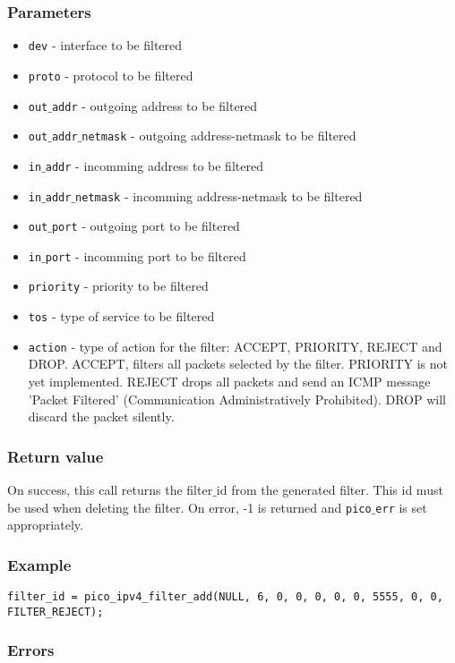 \subsubsection*{Parameters}
\begin{itemize}[noitemsep]
\item \texttt{dev} - interface to be filtered
\item \texttt{proto} - protocol to be filtered
\item \texttt{out$\_$addr} - outgoing address to be filtered
\item \texttt{out$\_$addr$\_$netmask} - outgoing address-netmask to be filtered
\item \texttt{in$\_$addr} - incomming address to be filtered
\item \texttt{in$\_$addr$\_$netmask} - incomming address-netmask to be filtered
\item \texttt{out$\_$port} - outgoing port to be filtered
\item \texttt{in$\_$port} - incomming port to be filtered
\item \texttt{priority} - priority to be filtered
\item \texttt{tos} - type of service to be filtered
\item \texttt{action} - type of action for the filter: ACCEPT, PRIORITY, REJECT and DROP. ACCEPT, filters all packets selected by the filter. PRIORITY is not yet implemented. REJECT drops all packets and send an ICMP message 'Packet Filtered' (Communication Administratively Prohibited). DROP will discard the packet silently.
\end{itemize}

\subsubsection*{Return value}
On success, this call returns the filter$\_$id from the generated filter. This id must be used when deleting the filter.
On error, -1 is returned and \texttt{pico$\_$err} is set appropriately.

\subsubsection*{Example}
\begin{verbatim}
filter_id = pico_ipv4_filter_add(NULL, 6, 0, 0, 0, 0, 0, 5555, 0, 0, FILTER_REJECT);
\end{verbatim}

\subsubsection*{Errors}

